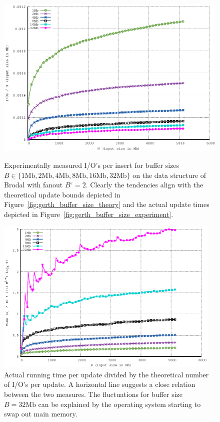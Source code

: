 \documentclass[twoside,11pt,openright]{report}
\def \epsilon {\varepsilon}
\begin{document}
\begin{figure}[htp]
\centering
\includegraphics[width=\textwidth]{../src/experiments/gerth_buffer_size_experiment_results/2016-05-03.13_51_54/io_per_insert}
\caption{Experimentally measured I/O's per insert for buffer sizes \\ $B \in \{1 \text{Mb}, 2 \text{Mb}, 4 \text{Mb}, 8 \text{Mb}, 16 \text{Mb}, 32 \text{Mb} \}$ on the data structure of Brodal with fanout $B^\epsilon = 2$. Clearly the tendencies align with the theoretical update bounds depicted in Figure~\ref{fig:gerth_buffer_size_theory} and the actual update times depicted in Figure~\ref{fig:gerth_buffer_size_experiment}.}
\label{fig:gerth_buffer_size_experiment_ios_per_insert}

\includegraphics[width=0.96\textwidth]{../src/experiments/gerth_buffer_size_experiment_results/2016-05-03.13_51_54/time_divided_asymptotic}
\caption{Actual running time per update divided by the theoretical number of I/O's per update. A horizontal line suggests a close relation between the two measures. The fluctuations for buffer size $B = 32 \text{Mb}$ can be explained by the operating system starting to swap out main memory.}
\label{fig:gerth_buffer_size_experiment_time_divided_asymptotic}
\end{figure}
\end{document}
